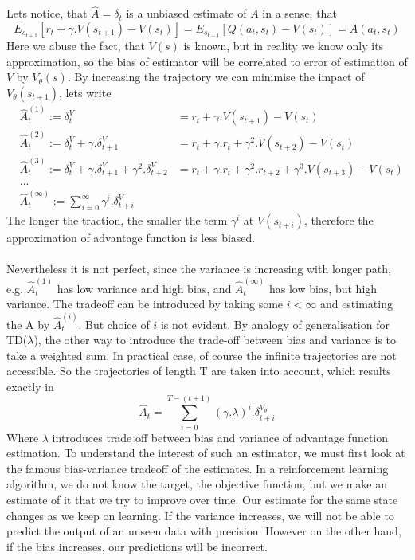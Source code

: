 \documentclass{article}
\begin{document}
Lets notice, that $\hat{A}=\delta_t$ is a unbiased estimate of $A$ in a sense, that 
$$
E_{s_{t+1}}[r_t + \gamma .V(s_{t+1}) - V(s_t)] = E_{s_{t+1}}[Q(a_t, s_t) - V(s_t)] = A(a_t, s_t)
$$
Here we abuse the fact, that $V(s)$ is known, but in reality we know only its approximation, so the bias of estimator will be correlated to error of estimation of $V$ by  $V_\theta(s)$. By increasing the trajectory we can minimise the impact of $V_\theta(s_{t+1})$, lets write
\begin{equation}
 \begin{aligned}
&\hat{A}_t^{(1)}:=\delta^V_t& =r_t + \gamma .V(s_{t+1}) - V(s_t) \\
&\hat{A}_t^{(2)}:=\delta^V_t + \gamma.\delta^V_{t+1}&=r_t + \gamma .r_t + \gamma^2.V(s_{t+2}) - V(s_t)\\
&\hat{A}_t^{(3)}:=\delta^V_t + \gamma.\delta^V_{t+1}+\gamma^2.\delta^V_{t+2}&=r_t + \gamma .r_t + \gamma^2.r_{t+2}+\gamma^3.V(s_{t+3}) - V(s_t)\\
&...&\\
&\hat{A}_t^{(\infty)} := \sum_{i=0}^{\infty} \gamma^i.\delta_{t+i}^{V}
 \end{aligned}
\end{equation}
The longer the traction, the smaller the term $\gamma^i$ at $V(s_{t+i})$, therefore the approximation of advantage function is less biased.
\\
\\
Nevertheless it is not perfect, since the variance is increasing with longer path, e.g. $\hat{A}^{(1)}_t$ has low variance and high bias, and $\hat{A}^{(\infty)}_t$ has low bias, but high variance. The tradeoff can be introduced by taking some $i < \infty$ and estimating the A by $\hat{A}^{(i)}_t$. But choice of $i$ is not evident. By analogy of generalisation for TD($\lambda$), the other way to introduce the trade-off between bias and variance is to take a weighted sum. In practical case, of course the infinite trajectories are not accessible. So the trajectories of length T are taken into account, which results exactly in
$$
\hat{A}_t = \sum_{i=0}^{T-(t+1)} (\gamma .\lambda)^i .\delta^{V_\theta}_{t + i}
$$
Where $\lambda$ introduces trade off between bias and variance of advantage function estimation.
To understand the interest of such an estimator, we must first look at the famous bias-variance tradeoff of the estimates. In a reinforcement learning algorithm, we do not know the target, the objective function, but we make an estimate of it that we try to improve over time.  Our estimate for the same state changes as we keep on learning. If the variance increases, we will not be able to predict the output of an unseen data with precision. However on the other hand, if the bias increases, our predictions will be incorrect. 
\end{document}
